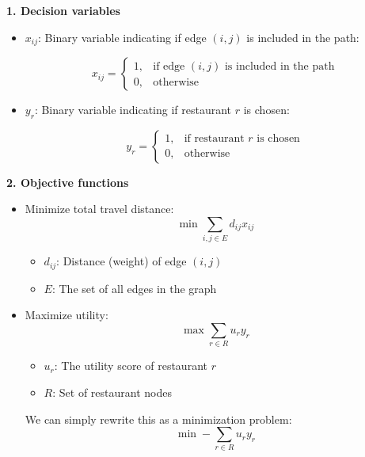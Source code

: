 \documentclass[12pt]{report}
\begin{document}
\textbf{1. Decision variables}
\begin{itemize}
    \item $x_{ij}$: Binary variable indicating if edge $(i,j)$ is included in the path:
    
    $$x_{ij} = \begin{cases}
        1, & \text{if edge } (i,j) \text{ is included in the path}\\
        0, & \text{otherwise}
    \end{cases}$$

    \item $y_r$: Binary variable indicating if restaurant $r$ is chosen:
    
    $$y_r = \begin{cases}
        1, & \text{if restaurant } r \text{ is chosen}\\
        0, & \text{otherwise}
    \end{cases}$$
\end{itemize}

\textbf{2. Objective functions}
\begin{itemize}
    \item Minimize total travel distance:
    $$\min \sum_{i,j \in E} d_{ij}x_{ij}$$
    \begin{itemize}
        \item $d_{ij}$: Distance (weight) of edge $(i,j)$
        \item $E$: The set of all edges in the graph
    \end{itemize}

    \item Maximize utility:
    $$\max \sum_{r \in R} u_r y_r$$
    \begin{itemize}
        \item $u_r$: The utility score of restaurant $r$
        \item $R$: Set of restaurant nodes
    \end{itemize}

    We can simply rewrite this as a minimization problem:
    $$\min -\sum_{r \in R} u_r y_r$$
\end{itemize}
\end{document}

